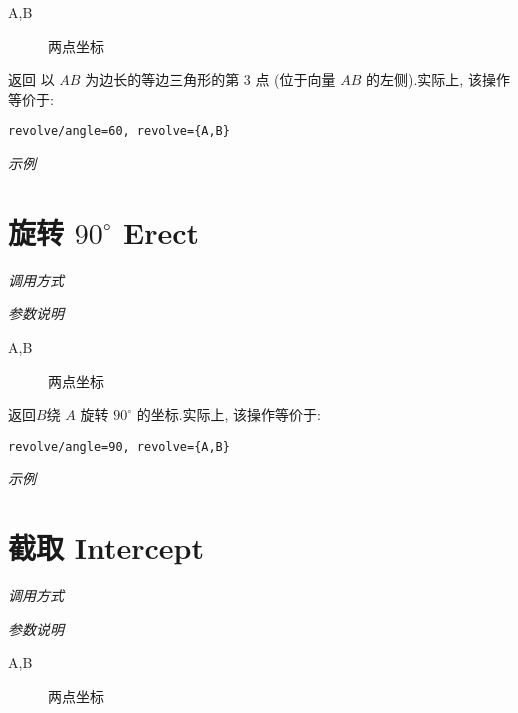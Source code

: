 \begin{description}
  \item[A,B] 两点坐标
\end{description}

返回 以 $AB$ 为边长的等边三角形的第 3 点 (位于向量 $AB$ 的左侧).实际上, 该操作等价于:

\begin{verbatim}
revolve/angle=60, revolve={A,B}
\end{verbatim}

\emph{示例}


\section{旋转 $90^\circ$ Erect}

\emph{调用方式}

\begin{tcolorbox}{}
\end{tcolorbox}

\emph{参数说明}

\begin{description}
  \item[A,B] 两点坐标
\end{description}

返回$B$绕 $A$ 旋转 $90^\circ$ 的坐标.实际上, 该操作等价于:

\begin{verbatim}
revolve/angle=90, revolve={A,B}
\end{verbatim}

\emph{示例}


\section{截取 Intercept}

\emph{调用方式}

\begin{tcolorbox}{}
\end{tcolorbox}

\emph{参数说明}

\begin{description}
  \item[A,B] 两点坐标
\end{description}

